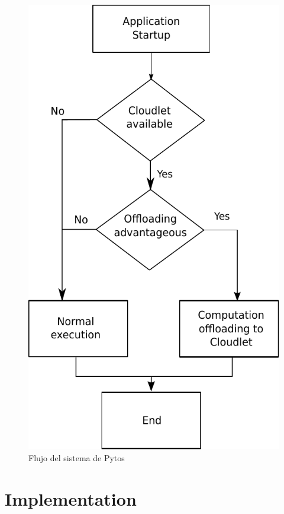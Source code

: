 \begin{figure}
\centering
 \includegraphics[scale=0.6]{Figures/pytosworkflow.pdf}
 \caption{Flujo del sistema de Pytos}
 \label{fig:pytosWorkflow}
\end{figure}


\section{Implementation}
\label{sec:implementation}

